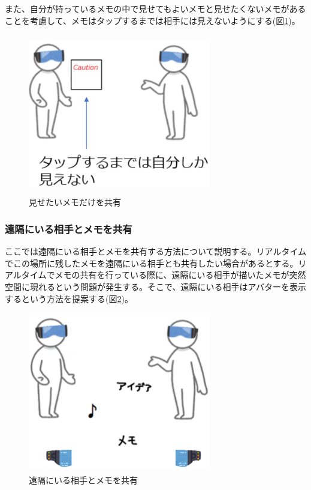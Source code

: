 \documentclass[11pt,a4j, titlepage]{jarticle} %
\begin{document}
また、自分が持っているメモの中で見せてもよいメモと見せたくないメモがあることを考慮して、メモはタップするまでは相手には見えないようにする(図\ref{fig:sharing_taimen2})。

\begin{figure}[H]
  \begin{center}
    \includegraphics[clip,height=7.0cm,width=8.0cm]{./sharing_taimen2.eps}
    \caption{見せたいメモだけを共有}
    \label{fig:sharing_taimen2}
  \end{center}
\end{figure}

\subsubsection{遠隔にいる相手とメモを共有}
ここでは遠隔にいる相手とメモを共有する方法について説明する。リアルタイムでこの場所に残したメモを遠隔にいる相手とも共有したい場合があるとする。リアルタイムでメモの共有を行っている際に、遠隔にいる相手が描いたメモが突然空間に現れるという問題が発生する。そこで、遠隔にいる相手はアバターを表示するという方法を提案する(図\ref{fig:sharing_enkaku})。

\begin{figure}[H]
  \begin{center}
    \includegraphics[clip,height=7.0cm,width=8.0cm]{./sharing_enkaku.eps}
    \caption{遠隔にいる相手とメモを共有}
    \label{fig:sharing_enkaku}
  \end{center}
\end{figure}
\end{document}

